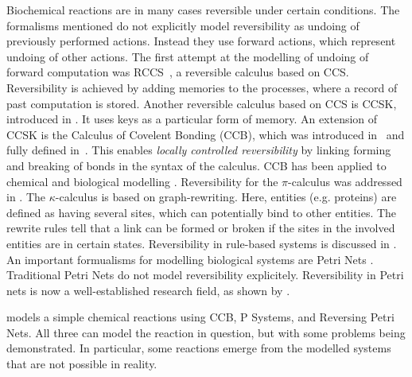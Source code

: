 Biochemical reactions are in many cases reversible under certain conditions. The formalisms mentioned do not explicitly model reversibility as undoing of previously performed actions. Instead they use forward actions, which represent undoing of other actions.
The first attempt at the modelling of undoing of forward computation was RCCS~\cite{10.1007/978-3-540-28644-8_19}, a reversible calculus based on CCS. Reversibility is achieved by adding memories to the processes, where a record of past computation is stored. Another reversible calculus based on CCS is CCSK, introduced in \cite{PHILLIPS200770}. It uses keys as a particular form of memory. An extension of CCSK is the Calculus of Covelent Bonding (CCB), which was introduced in~\cite{KU16} and fully defined in~\cite{KU2017}. This enables \textit{locally controlled reversibility} by linking forming and breaking of bonds in the syntax of the calculus. CCB has been applied to chemical and biological modelling \cite{10.1007/978-3-319-99498-7_8, Kuhn2020ReversibilityIC}. Reversibility for the $\pi$-calculus was addressed in \cite{10.1007/978-3-642-15375-4_33}. The $\kappa$-calculus \cite{DANOS200469} is based on graph-rewriting. Here, entities (e.g. proteins) are defined as having several sites, which can potentially bind to other entities. The rewrite rules tell that a link can be formed or broken if the sites in the involved entities are in certain states. Reversibility in rule-based systems is discussed in \cite{Aman2020}. An important formualisms for modelling biological systems are Petri Nets \cite{10.1007/978-3-540-68894-5_7}. Traditional Petri Nets do not model reversibility explicitely. Reversibility in Petri nets is now a well-established research field, as shown by \cite{DBLP:conf/rc/PhilippouP18,DBLP:conf/apn/BarylskaGMPPP18,DBLP:journals/corr/abs-2010-04000}. 

\cite{Kuhn2020ReversibilityIC} models a simple chemical reactions using CCB, P Systems, and Reversing Petri Nets. All three can model the reaction in question, but with some problems being demonstrated. In particular, some reactions emerge from the modelled systems that are not possible in reality.
